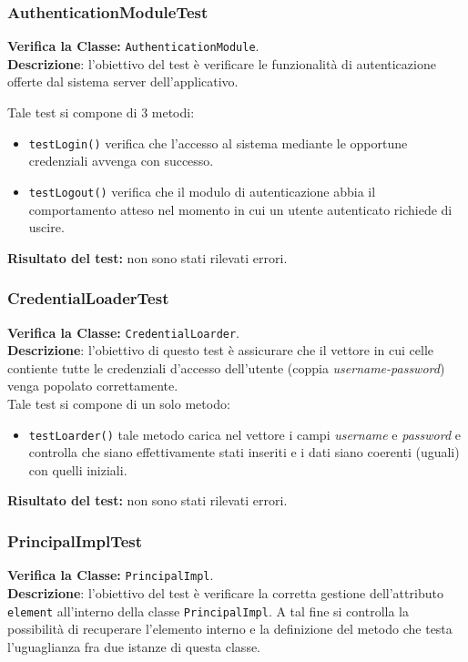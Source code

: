 \begin{table}
\end{table}

\subsubsection{AuthenticationModuleTest}
\textbf{Verifica la Classe:} \texttt{AuthenticationModule}.\\
\textbf{Descrizione}: l'obiettivo del test è verificare le funzionalità di autenticazione offerte dal sistema server dell'applicativo.

Tale test si compone di 3 metodi:
\begin{itemize}
\item \texttt{testLogin()} verifica che l'accesso al sistema mediante le opportune credenziali avvenga con successo.
\item \texttt{testLogout()} verifica che il modulo di autenticazione abbia il comportamento atteso nel momento in cui un utente autenticato richiede di uscire.
\end{itemize}
\textbf{Risultato del test:} non sono stati rilevati errori.

\begin{table}
\end{table}

\subsubsection{CredentialLoaderTest}
\textbf{Verifica la Classe:} \texttt{CredentialLoarder}.\\
\textbf{Descrizione}: l'obiettivo di questo test è assicurare che il vettore in cui celle contiente tutte le credenziali d'accesso dell'utente (coppia \textit{username-password}) venga popolato correttamente.\\
Tale test si compone di un solo metodo:
\begin{itemize}
\item \texttt{testLoarder()} tale metodo carica nel vettore i campi \textit{username} e \textit{password} e controlla che siano effettivamente stati inseriti e i dati siano coerenti (uguali) con quelli iniziali.
\end{itemize}
\textbf{Risultato del test:} non sono stati rilevati errori.

\subsubsection{PrincipalImplTest}
\textbf{Verifica la Classe:} \texttt{PrincipalImpl}.\\
\textbf{Descrizione}: l'obiettivo del test è verificare la corretta gestione dell'attributo \texttt{element} all'interno della classe \texttt{PrincipalImpl}. A tal fine si controlla la possibilità di recuperare l'elemento interno e la definizione del metodo che testa l'uguaglianza fra due istanze di questa classe.

